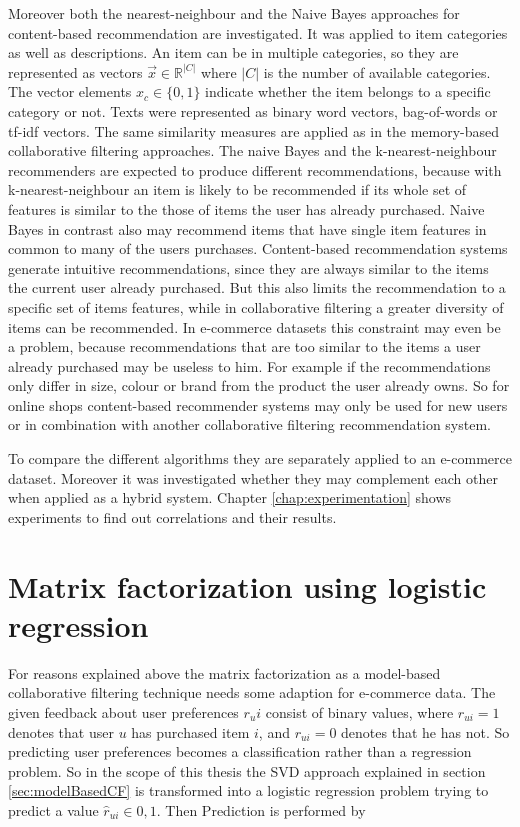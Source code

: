 \documentclass[10pt]{reportMaster}
\begin{document}
Moreover both the nearest-neighbour and the Naive Bayes approaches for content-based recommendation are investigated.
It was applied to item categories as well as descriptions.
An item can be in multiple categories, so they are represented as vectors $\vec{x} \in \mathds{R}^{|C|}$ where $|C|$ is the number of available categories.
The vector elements $x_c \in \{0,1\}$ indicate whether the item belongs to a specific category or not. 
Texts were represented as binary word vectors, bag-of-words or tf-idf vectors. %
The same similarity measures are applied as in the memory-based collaborative filtering approaches.
The naive Bayes and the k-nearest-neighbour recommenders are expected to produce different recommendations, because with k-nearest-neighbour an item is likely to be recommended if its whole set of features is similar to the those of items the user has already purchased.
Naive Bayes in contrast also may recommend items that have single item features in common to many of the users purchases.
Content-based recommendation systems generate intuitive recommendations, since they are always similar to the items the current user already purchased.
But this also limits the recommendation to a specific set of items features, while in collaborative filtering a greater diversity of items can be recommended.
In e-commerce datasets this constraint may even be a problem, because recommendations that are too similar to the items a user already purchased may be useless to him.
For example if the recommendations only differ in size, colour or brand from the product the user already owns.
So for online shops content-based recommender systems may only be used for new users or in combination with another collaborative filtering recommendation system. %

To compare the different algorithms they are separately applied to an e-commerce dataset.
Moreover it was investigated whether they may complement each other when applied as a hybrid system.
Chapter \ref{chap:experimentation} shows experiments to find out correlations and their results.


\section{Matrix factorization using logistic regression}
\label{sec:logRegSVD}

For reasons explained above the matrix factorization as a model-based collaborative filtering technique needs some adaption for e-commerce data.
The given feedback about user preferences $r_ui$ consist of binary values, where $r_{ui} = 1$ denotes that user $u$ has purchased item $i$, and $r_{ui} = 0$ denotes that he has not.
So predicting user preferences becomes a classification rather than a regression problem.
So in the scope of this thesis the SVD approach explained in section \ref{sec:modelBasedCF} is transformed into a logistic regression problem trying to predict a value $\hat{r}_{ui} \in {0,1}$.
Then Prediction is performed by 
\end{document}
